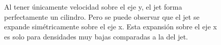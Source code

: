 \documentclass[12pt,a4paper]{book}
\begin{document}
\begin{figure}[H]
\centering
{}
\caption{Al tener únicamente velocidad sobre el eje y, el jet forma perfectamente un cilindro. Pero se puede observar que el jet se expande simétricamente sobre el eje x. Esta expansión sobre el eje x es solo para densidades muy bajas comparadas a la del jet.}
\end{figure}
\end{document}
